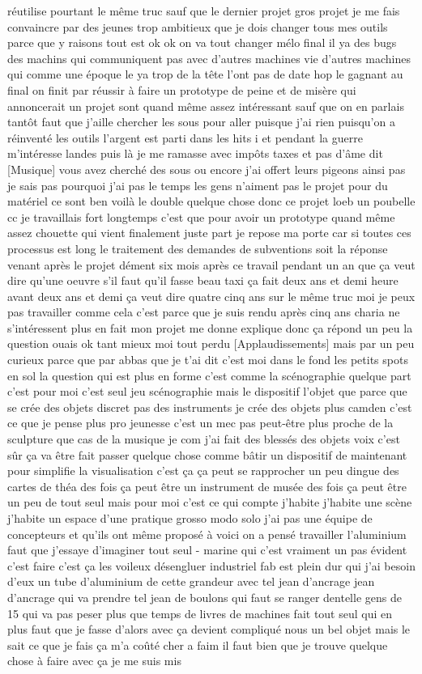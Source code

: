 réutilise pourtant le même truc sauf que le dernier projet gros projet je me fais convaincre par des jeunes trop ambitieux que je dois changer tous mes outils parce que y raisons tout est ok ok on va tout changer mélo final il ya des bugs des machins qui communiquent pas avec d'autres machines vie d'autres machines qui comme une époque le ya trop de la tête l'ont pas de date hop le gagnant au final on finit par réussir à faire un prototype de peine et de misère qui annoncerait un projet sont quand même assez intéressant sauf que on en parlais tantôt faut que j'aille chercher les sous pour aller puisque j'ai rien puisqu'on a réinventé les outils l'argent est parti dans les hits i et pendant la guerre m'intéresse landes puis là je me ramasse avec impôts taxes et pas d'âme dit [Musique] vous avez cherché des sous ou encore j'ai offert leurs pigeons ainsi pas je sais pas pourquoi j'ai pas le temps les gens n'aiment pas le projet pour du matériel ce sont ben voilà le double quelque chose donc ce projet loeb un poubelle cc je travaillais fort longtemps c'est que pour avoir un prototype quand même assez chouette qui vient finalement juste part je repose ma porte car si toutes ces processus est long le traitement des demandes de subventions soit la réponse venant après le projet dément six mois après ce travail pendant un an que ça veut dire qu'une oeuvre s'il faut qu'il fasse beau taxi ça fait deux ans et demi heure avant deux ans et demi ça veut dire quatre cinq ans sur le même truc moi je peux pas travailler comme cela c'est parce que je suis rendu après cinq ans charia ne s'intéressent plus en fait mon projet me donne explique donc ça répond un peu la question ouais ok tant mieux moi tout perdu [Applaudissements] mais par un peu curieux parce que par abbas que je t'ai dit c'est moi dans le fond les petits spots en sol la question qui est plus en forme c'est comme la scénographie quelque part c'est pour moi c'est seul jeu scénographie mais le dispositif l'objet que parce que se crée des objets discret pas des instruments je crée des objets plus camden c'est ce que je pense plus pro jeunesse c'est un mec pas peut-être plus proche de la sculpture que cas de la musique je com j'ai fait des blessés des objets voix c'est sûr ça va être fait passer quelque chose comme bâtir un dispositif de maintenant pour simplifie la visualisation c'est ça ça peut se rapprocher un peu dingue des cartes de théa des fois ça peut être un instrument de musée des fois ça peut être un peu de tout seul mais pour moi c'est ce qui compte j'habite j'habite une scène j'habite un espace d'une pratique grosso modo solo j'ai pas une équipe de concepteurs et qu'ils ont même proposé à voici on a pensé travailler l'aluminium faut que j'essaye d'imaginer tout seul - marine qui c'est vraiment un pas évident c'est faire c'est ça les voileux désengluer industriel fab est plein dur qui j'ai besoin d'eux un tube d'aluminium de cette grandeur avec tel jean d'ancrage jean d'ancrage qui va prendre tel jean de boulons qui faut se ranger dentelle gens de 15 qui va pas peser plus que temps de livres de machines fait tout seul qui en plus faut que je fasse d'alors avec ça devient compliqué nous un bel objet mais le sait ce que je fais ça m'a coûté cher a faim il faut bien que je trouve quelque chose à faire avec ça je me suis mis 